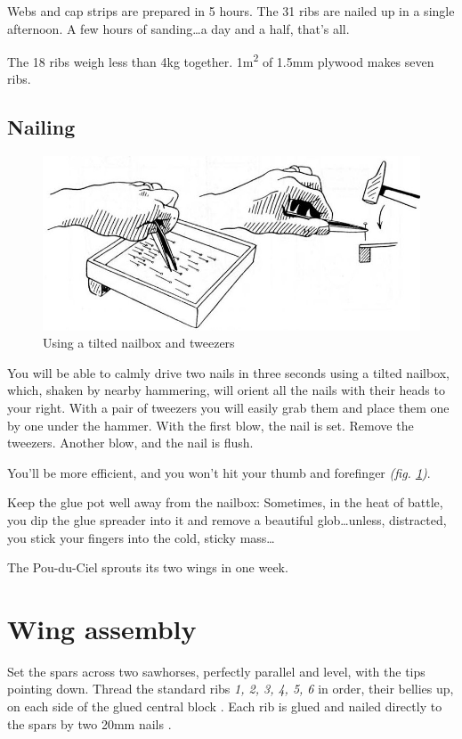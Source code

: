 \documentclass{book}
\newcommand*\circled[1]{\tikz[baseline=(char.base)]{
    \node[shape=circle,draw,inner sep=0.15pt] (char) {\footnotesize#1};}}
\begin{document}
Webs and cap strips are prepared in 5 hours.  The 31 ribs are nailed
up in a single afternoon.  A few hours of sanding\ldots a day and a
half, that's all.

The 18 ribs weigh less than 4kg together.  1m\textsuperscript{2} of
1.5mm plywood makes seven ribs.

\subsection{Nailing}

\begin{figure}
  \includegraphics[width=\linewidth]{fig-45.jpg}
  \caption{Using a tilted nailbox and tweezers}
  \label{fig:fortyfive}
\end{figure}

You will be able to calmly drive two nails in three seconds using a
tilted nailbox, which, shaken by nearby hammering, will orient all the
nails with their heads to your right.  With a pair of tweezers you
will easily grab them and place them one by one under the hammer.
With the first blow, the nail is set.  Remove the tweezers.  Another
blow, and the nail is flush.

You'll be more efficient, and you won't hit your thumb and forefinger
\textit{(fig. \ref{fig:fortyfive})}.

Keep the glue pot well away from the nailbox: Sometimes, in the heat
of battle, you dip the glue spreader into it and remove a beautiful
glob\ldots unless, distracted, you stick your fingers into the cold,
sticky mass\ldots

The Pou-du-Ciel sprouts its two wings in one week.

\section{Wing assembly}

Set the spars across two sawhorses, perfectly parallel and level, with
the tips pointing down.  Thread the standard ribs \textit{1, 2, 3, 4,
  5, 6} in order, their bellies up, on each side of the glued central
block \circled{204}.  Each rib is glued and nailed directly to the
spars by two 20mm nails \circled{230}.
\end{document}
